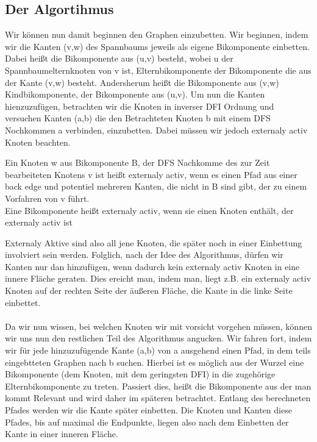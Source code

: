 \documentclass[runningheads]{llncs}
\begin{document}
    \subsection{Der Algortihmus}
    Wir können nun damit beginnen den Graphen einzubetten. Wir beginnen, indem wir die Kanten (v,w) des Spannbaums jeweils als eigene Bikomponente einbetten.
    Dabei heißt die Bikomponente aus (u,v) besteht, wobei u der Spannbaumelternknoten von v ist, Elternbikomponente der Bikomponente die aus der Kante (v,w) besteht.
    Andersherum heißt die Bikomponente aus (v,w) Kindbikomponente, der Bikomponente aus (u,v). Um nun die Kanten hienzuzufügen, betrachten wir die Knoten in inverser DFI Ordnung und versuchen Kanten (a,b) die den Betrachteten Knoten b mit einem DFS Nochkommen a verbinden, einzubetten. Dabei müssen wir jedoch externaly activ Knoten beachten.
    \begin{definition}
        Ein Knoten w aus Bikomponente B, der DFS Nachkomme des zur Zeit bearbeiteten Knotens v ist heißt externaly activ,  
        wenn es einen Pfad aus einer back edge und potentiel mehreren Kanten, die nicht in B sind gibt, der zu einem Vorfahren von v führt.
        \\
        Eine Bikomponente heißt externaly activ, wenn sie einen Knoten enthält, der externaly activ ist
    \end{definition}
    Externaly Aktive sind also all jene Knoten, die später noch in einer Einbettung involviert sein werden. Folglich, nach der Idee des Algorithmus, dürfen
    wir Kanten nur dan hinzufügen, wenn dadurch kein externaly activ Knoten in eine innere Fläche geraten. Dies ereicht man, indem man, liegt z.B. ein externaly activ
    Knoten auf der rechten Seite der äußeren Fläche, die Kante in die linke Seite einbettet.
    \\
    \\
    Da wir nun wissen, bei welchen Knoten wir mit vorsicht vorgehen müssen, können wir uns nun den restlichen Teil des Algorithmus angucken. Wir fahren fort, indem wir für jede hinzuzufügende Kante
    (a,b) von a ausgehend einen Pfad, in dem teils eingebtteten Graphen nach b suchen. Hierbei ist es möglich aus der Wurzel eine Bikomponente (dem Knoten, mit dem geringsten DFI) in die
    zugehörige Elternbikomponente zu treten. Passiert dies, heißt die Bikomponente aus der man kommt Relevant und wird daher im späteren betrachtet. Entlang des berechneten Pfades werden wir die Kante später einbetten. Die Knoten und Kanten diese Pfades, bis auf maximal die Endpunkte, liegen also nach dem Einbetten der Kante in einer inneren Fläche.
\end{document}
